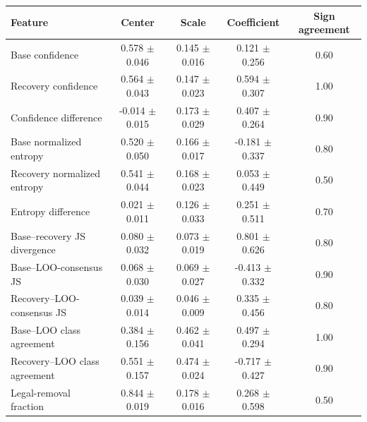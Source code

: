 \begin{tabular}{lcccc}
\toprule
Feature & Center & Scale & Coefficient & Sign agreement \\
\midrule
Base confidence & 0.578 $\pm$ 0.046 & 0.145 $\pm$ 0.016 & 0.121 $\pm$ 0.256 & 0.60 \\
Recovery confidence & 0.564 $\pm$ 0.043 & 0.147 $\pm$ 0.023 & 0.594 $\pm$ 0.307 & 1.00 \\
Confidence difference & -0.014 $\pm$ 0.015 & 0.173 $\pm$ 0.029 & 0.407 $\pm$ 0.264 & 0.90 \\
Base normalized entropy & 0.520 $\pm$ 0.050 & 0.166 $\pm$ 0.017 & -0.181 $\pm$ 0.337 & 0.80 \\
Recovery normalized entropy & 0.541 $\pm$ 0.044 & 0.168 $\pm$ 0.023 & 0.053 $\pm$ 0.449 & 0.50 \\
Entropy difference & 0.021 $\pm$ 0.011 & 0.126 $\pm$ 0.033 & 0.251 $\pm$ 0.511 & 0.70 \\
Base--recovery JS divergence & 0.080 $\pm$ 0.032 & 0.073 $\pm$ 0.019 & 0.801 $\pm$ 0.626 & 0.80 \\
Base--LOO-consensus JS & 0.068 $\pm$ 0.030 & 0.069 $\pm$ 0.027 & -0.413 $\pm$ 0.332 & 0.90 \\
Recovery--LOO-consensus JS & 0.039 $\pm$ 0.014 & 0.046 $\pm$ 0.009 & 0.335 $\pm$ 0.456 & 0.80 \\
Base--LOO class agreement & 0.384 $\pm$ 0.156 & 0.462 $\pm$ 0.041 & 0.497 $\pm$ 0.294 & 1.00 \\
Recovery--LOO class agreement & 0.551 $\pm$ 0.157 & 0.474 $\pm$ 0.024 & -0.717 $\pm$ 0.427 & 0.90 \\
Legal-removal fraction & 0.844 $\pm$ 0.019 & 0.178 $\pm$ 0.016 & 0.268 $\pm$ 0.598 & 0.50 \\
\bottomrule
\end{tabular}

